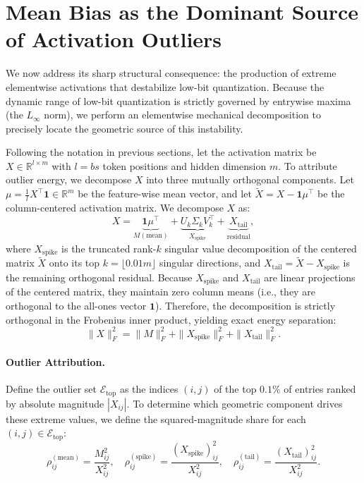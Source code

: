 \section{Mean Bias as the Dominant Source of Activation Outliers}
\label{sec:activation_outliers}

We now address its sharp structural consequence: the production of extreme elementwise activations that destabilize low-bit quantization. Because the dynamic range of low-bit quantization is strictly governed by entrywise maxima (the $L_\infty$ norm), we perform an elementwise mechanical decomposition to precisely locate the geometric source of this instability.

Following the notation in previous sections, let the activation matrix be
$X \in \mathbb{R}^{l \times m}$ with $l=bs$ token positions and hidden dimension $m$.
To attribute outlier energy, we decompose $X$ into three mutually orthogonal components.
Let $\mu = \frac{1}{l}X^\top \mathbf{1} \in \mathbb{R}^m$ be the feature-wise mean vector,
and let $\tilde{X} = X - \mathbf{1}\mu^\top$ be the column-centered activation matrix. We decompose $X$ as:
\begin{equation}
X = \underbrace{\mathbf{1}\mu^\top}_{M (\text{mean})} + \underbrace{U_k \Sigma_k V_k^\top}_{X_{\text{spike}}} + \underbrace{X_{\text{tail}}}_{\text{residual}},
\end{equation}
where $X_{\text{spike}}$ is the truncated rank-$k$ singular value decomposition of the centered matrix $\tilde{X}$ onto its top $k = \lfloor 0.01 m \rfloor$ singular directions, and $X_{\text{tail}} = \tilde{X} - X_{\text{spike}}$ is the remaining orthogonal residual. Because $X_{\text{spike}}$ and $X_{\text{tail}}$ are linear projections of the centered matrix, they maintain zero column means (i.e., they are orthogonal to the all-ones vector $\mathbf{1}$). Therefore, the decomposition is strictly orthogonal in the Frobenius inner product, yielding exact energy separation:
\begin{equation}
\|X\|_F^2 = \|M\|_F^2 + \|X_{\text{spike}}\|_F^2 + \|X_{\text{tail}}\|_F^2.
\end{equation}



\paragraph{Outlier Attribution.} 
Define the outlier set $\mathcal{E}_{\text{top}}$ as the indices $(i,j)$ of the top $0.1\%$ of entries ranked by absolute magnitude $|X_{ij}|$. To determine which geometric component drives these extreme values, we define the squared-magnitude share for each $(i,j) \in \mathcal{E}_{\text{top}}$:
\begin{equation}
\rho_{ij}^{(\text{mean})} = \frac{M_{ij}^2}{X_{ij}^2}, \quad \rho_{ij}^{(\text{spike})} = \frac{(X_{\text{spike}})_{ij}^2}{X_{ij}^2}, \quad \rho_{ij}^{(\text{tail})} = \frac{(X_{\text{tail}})_{ij}^2}{X_{ij}^2}.
\end{equation}

